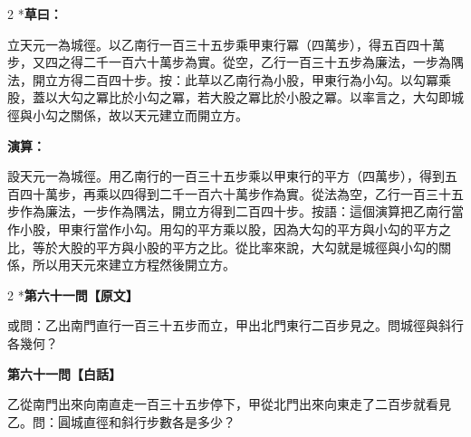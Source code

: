 \documentclass[11pt,a4paper]{article}
\begin{document}
\begin{paracol}{2}
\switchcolumn[0]*\textbf{草曰：}

\small 立天元一為城徑。以乙南行一百三十五步乘甲東行冪（四萬步），得五百四十萬步，又四之得二千一百六十萬步為實。從空，乙行一百三十五步為廉法，一步為隅法，開立方得二百四十步。按：此草以乙南行為小股，甲東行為小勾。以勾冪乘股，蓋以大勾之冪比於小勾之冪，若大股之冪比於小股之冪。以率言之，大勾即城徑與小勾之關係，故以天元建立而開立方。

\switchcolumn\textbf{演算：}

\small 設天元一為城徑。用乙南行的一百三十五步乘以甲東行的平方（四萬步），得到五百四十萬步，再乘以四得到二千一百六十萬步作為實。從法為空，乙行一百三十五步作為廉法，一步作為隅法，開立方得到二百四十步。按語：這個演算把乙南行當作小股，甲東行當作小勾。用勾的平方乘以股，因為大勾的平方與小勾的平方之比，等於大股的平方與小股的平方之比。從比率來說，大勾就是城徑與小勾的關係，所以用天元來建立方程然後開立方。
\end{paracol}

\vspace{0.1cm}
\noindent{}
\par\vspace{0.3cm}

\begin{paracol}{2}
\switchcolumn[0]*\noindent\textbf{第六十一問【原文】}

\small 或問：乙出南門直行一百三十五步而立，甲出北門東行二百步見之。問城徑與斜行各幾何？

\switchcolumn\noindent\textbf{第六十一問【白話】}

\small 乙從南門出來向南直走一百三十五步停下，甲從北門出來向東走了二百步就看見乙。問：圓城直徑和斜行步數各是多少？
\end{paracol}

\vspace{0.1cm}
\noindent{}
\par\vspace{0.15cm}
\end{document}
